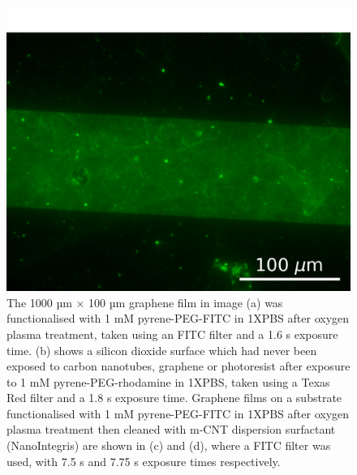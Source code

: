 \documentclass[
  a4paper,
]{scrbook}
\begin{document}
\begin{figure}
\begin{minipage}[t]{0.47\linewidth}
{{\includegraphics{figures/ch7/modified_NGW6D7_PyPEGFITC_channel1_postmsurfclean_7.75sexposure_40X_221123.png}

}

}

\subcaption{\label{fig-PPF-PBS-40X}}
\end{minipage}%

\caption{\label{fig-silicon-dioxide-interaction}The 1000 µm \(\times\)
100 µm graphene film in image (a) was functionalised with 1 mM
pyrene-PEG-FITC in 1XPBS after oxygen plasma treatment, taken using an
FITC filter and a 1.6 s exposure time. (b) shows a silicon dioxide
surface which had never been exposed to carbon nanotubes, graphene or
photoresist after exposure to 1 mM pyrene-PEG-rhodamine in 1XPBS, taken
using a Texas Red filter and a 1.8 s exposure time. Graphene films on a
substrate functionalised with 1 mM pyrene-PEG-FITC in 1XPBS after oxygen
plasma treatment then cleaned with m-CNT dispersion surfactant
(NanoIntegris) are shown in (c) and (d), where a FITC filter was used,
with 7.5 s and 7.75 s exposure times respectively.}

\end{figure}
\end{document}
